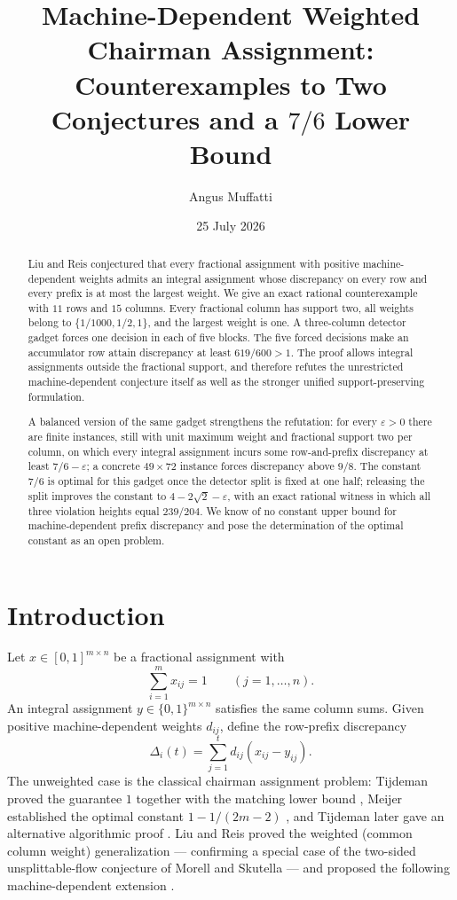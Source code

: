 \documentclass[11pt]{article}
\title{Machine-Dependent Weighted Chairman Assignment:\\
Counterexamples to Two Conjectures and a $7/6$ Lower Bound}
\author{Angus Muffatti}
\date{25 July 2026}
\theoremstyle{definition}
\newcommand{\disc}{\Delta}
\begin{document}
\maketitle

\begin{abstract}
Liu and Reis conjectured that every fractional assignment with positive
machine-dependent weights admits an integral assignment whose discrepancy on
every row and every prefix is at most the largest weight.  We give an exact
rational counterexample with $11$ rows and $15$ columns.  Every fractional
column has support two, all weights belong to
$\{1/1000,1/2,1\}$, and the largest weight is one.  A three-column detector
gadget forces one decision in each of five blocks.  The five forced decisions
make an accumulator row attain discrepancy at least
$619/600>1$.  The proof allows integral assignments outside the fractional
support, and therefore refutes the unrestricted machine-dependent conjecture
itself as well as the stronger unified support-preserving formulation.

A balanced version of the same gadget strengthens the refutation: for every
$\varepsilon>0$ there are finite instances, still with unit maximum weight
and fractional support two per column, on which every integral assignment
incurs some row-and-prefix discrepancy at least $7/6-\varepsilon$; a concrete
$49\times72$ instance forces discrepancy above $9/8$.  The constant $7/6$ is
optimal for this gadget once the detector split is fixed at one half;
releasing the split improves the constant to $4-2\sqrt2-\varepsilon$, with an
exact rational witness in which all three violation heights equal
$239/204$.  We know of no constant upper bound
for machine-dependent prefix discrepancy and pose the determination of the
optimal constant as an open problem.
\end{abstract}

\section{Introduction}

Let $x\in[0,1]^{m\times n}$ be a fractional assignment with
\[
 \sum_{i=1}^m x_{ij}=1\qquad(j=1,\ldots,n).
\]
An integral assignment $y\in\{0,1\}^{m\times n}$ satisfies the same column
sums.  Given positive machine-dependent weights $d_{ij}$, define the
row-prefix discrepancy
\[
 \disc_i(t)=\sum_{j=1}^t d_{ij}(x_{ij}-y_{ij}).
\]
The unweighted case is the classical chairman assignment problem: Tijdeman
proved the guarantee $1$ together with the matching lower bound
\citep{Tijdeman1973}, Meijer
established the optimal constant $1-1/(2m-2)$ \citep{Meijer1973}, and
Tijdeman later gave an alternative algorithmic proof \citep{Tijdeman1980}.
Liu and Reis proved the weighted (common column weight) generalization —
confirming a special case of the two-sided unsplittable-flow conjecture of
Morell and Skutella \citep{MorellSkutella2022} — and proposed the following
machine-dependent extension \citep{LiuReis2026}.
\end{document}
